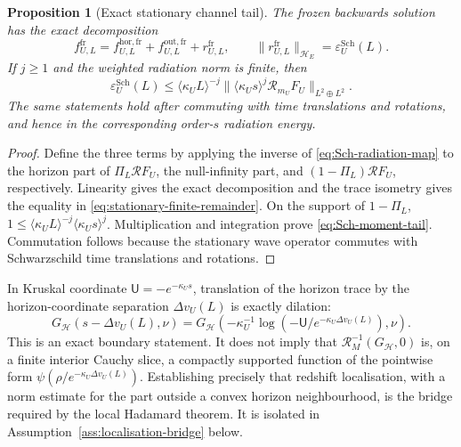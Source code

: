 \documentclass[11pt,a4paper]{article}
\newtheorem{proposition}[theorem]{Proposition}
\theoremstyle{definition}
\theoremstyle{remark}
\newcommand{\HH}{\mathcal H}
\begin{document}
	\begin{proposition}[Exact stationary channel tail]
		\label{prop:stationary-tail}
		The frozen backwards solution has the exact decomposition
		\begin{equation}
			f^{\mathrm{fr}}_{U,L}
			=f^{\mathrm{hor,fr}}_{U,L}+f^{\mathrm{out,fr}}_{U,L}
			+r^{\mathrm{fr}}_{U,L},
			\qquad
			\|r^{\mathrm{fr}}_{U,L}\|_{\mathcal H_E}
			=\varepsilon^{\mathrm{Sch}}_U(L).
			\label{eq:stationary-finite-remainder}
		\end{equation}
		If $j\geq1$ and the weighted radiation norm is finite, then
		\begin{equation}
			\varepsilon^{\mathrm{Sch}}_U(L)
			\leq \langle\kappa_UL\rangle^{-j}
			\|\langle\kappa_Us\rangle^j\mathcal R_{m_U}F_U\|_{L^2\oplus L^2}.
			\label{eq:Sch-moment-tail}
		\end{equation}
		The same statements hold after commuting with time translations and rotations,
		and hence in the corresponding order-$s$ radiation energy.
	\end{proposition}
	
	\begin{proof}
		Define the three terms by applying the inverse of
		\eqref{eq:Sch-radiation-map} to the horizon part of $\Pi_L\mathcal R F_U$,
		the null-infinity part, and $(1-\Pi_L)\mathcal R F_U$, respectively.
		Linearity gives the exact decomposition and the trace isometry gives the equality in
		\eqref{eq:stationary-finite-remainder}.  On the support of $1-\Pi_L$,
		$1\leq\langle\kappa_UL\rangle^{-j}
		\langle\kappa_Us\rangle^j$.  Multiplication and integration prove
		\eqref{eq:Sch-moment-tail}.  Commutation follows because the stationary wave
		operator commutes with Schwarzschild time translations and rotations.
	\end{proof}
	
	In Kruskal coordinate $\mathsf U=-e^{-\kappa_Us}$, translation of the
	horizon trace by the horizon-coordinate separation $\Delta v_U(L)$ is
	exactly dilation:
	\begin{equation}
		G_{\HH}(s-\Delta v_U(L),\nu)
		=G_{\HH}\!\left(-\kappa_U^{-1}
		\log(-\mathsf U/e^{-\kappa_U\Delta v_U(L)}),\nu\right).
		\label{eq:frozen-horizon-profile}
	\end{equation}
	This is an exact boundary statement.  It does not imply that
	$\mathcal R_M^{-1}(G_{\HH},0)$ is, on a finite interior Cauchy slice, a
	compactly supported function of the pointwise form
	$\psi(\rho/e^{-\kappa_U\Delta v_U(L)})$.  Establishing precisely that redshift
	localisation, with a norm estimate for the part outside a convex horizon
	neighbourhood, is the bridge required by the local Hadamard theorem.  It is
	isolated in Assumption~\ref{ass:localisation-bridge} below.
	
\end{document}
